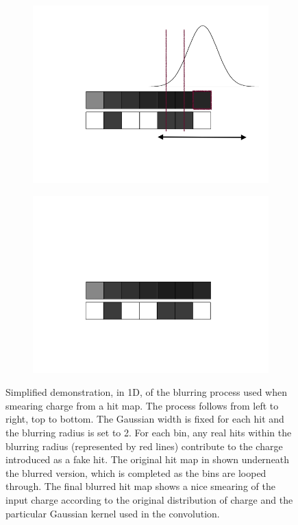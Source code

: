 \begin{figure}
\begin{subfigure}[t]{0.3\linewidth}
  \end{subfigure}
  \hfill
  \begin{subfigure}[t]{0.3\linewidth}
    \centering
    \includegraphics[width=\textwidth]{blurring8.png}
  \end{subfigure}
  \hfill
  \begin{subfigure}[t]{0.3\linewidth}
    \centering
    \includegraphics[width=\textwidth]{blurring9.png}
  \end{subfigure}
  \caption[Simplified demonstration, in 1D, of the blurring process used when smearing charge from a hit map.]{Simplified demonstration, in 1D, of the blurring process used when smearing charge from a hit map.  The process follows from left to right, top to bottom.  The Gaussian width is fixed for each hit and the blurring radius is set to 2.  For each bin, any real hits within the blurring radius (represented by red lines) contribute to the charge introduced as a fake hit.  The original hit map in shown underneath the blurred version, which is completed as the bins are looped through.  The final blurred hit map shows a nice smearing of the input charge according to the original distribution of charge and the particular Gaussian kernel used in the convolution.}
  \label{fig:BlurringProcess}
\end{figure}

